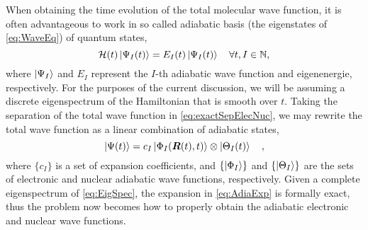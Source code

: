 When obtaining the time evolution of the total molecular wave function, it is
often advantageous to work in so called adiabatic basis (the eigenstates of
\cref{eq:WaveEq}) of quantum states,
\begin{equation}
\mathcal{H}(t) \left\vert \Psi_I (t) \right\rangle = E_I(t) \left\vert \Psi_I (t) \right\rangle
\quad \forall t, I \in \mathbb{N},
\label{eq:EigSpec}
\end{equation}
where $\left\vert \Psi_I \right\rangle$ and $E_I$ represent the $I$-th adiabatic wave function and
eigenenergie, respectively. For the purposes of the current discussion, we will
be assuming a discrete eigenspectrum of the Hamiltonian that is smooth over $t$.
Taking the separation of the total wave function in \cref{eq:exactSepElecNuc},
we may rewrite the total wave function as a linear combination of adiabatic
states,
\begin{equation}
\left\vert \Psi (t) \right\rangle = c_I \left\vert \Phi_I (\boldsymbol{R}(t),t) \right\rangle \otimes \left\vert \Theta_I (t) \right\rangle
\quad ,
\label{eq:AdiaExp}
\end{equation}
where $\{ c_I \}$ is a set of expansion coefficients, and $\{\left\vert \Phi_I \right\rangle\}$ and
$\{\left\vert \Theta_I \right\rangle\}$ are the sets of electronic and nuclear adiabatic wave
functions, respectively. Given a complete eigenspectrum of \cref{eq:EigSpec},
the expansion in \cref{eq:AdiaExp} is formally exact, thus the problem now
becomes how to properly obtain the adiabatic electronic and nuclear wave
functions.

